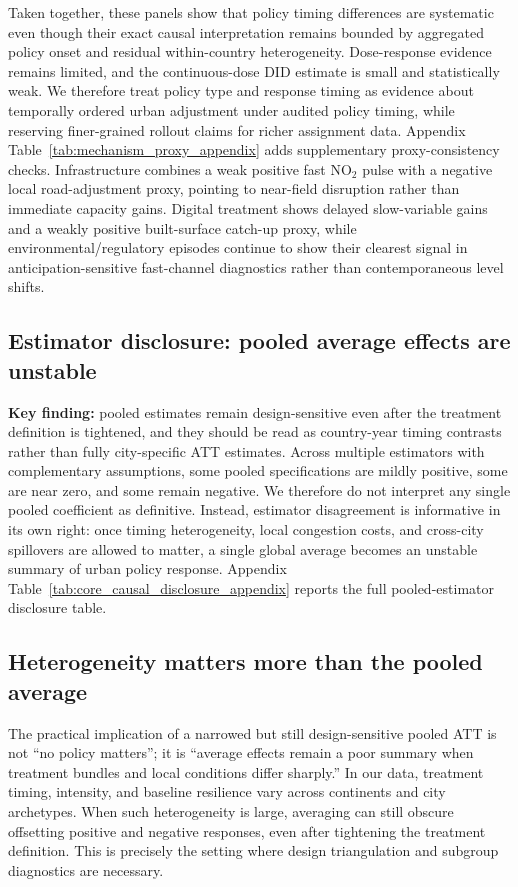 \documentclass[11pt,a4paper]{article}
\begin{document}
Taken together, these panels show that policy timing differences are systematic even though their exact causal interpretation remains bounded by aggregated policy onset and residual within-country heterogeneity.
Dose-response evidence remains limited, and the continuous-dose DID estimate is small and statistically weak.
We therefore treat policy type and response timing as evidence about temporally ordered urban adjustment under audited policy timing, while reserving finer-grained rollout claims for richer assignment data.
Appendix Table~\ref{tab:mechanism_proxy_appendix} adds supplementary proxy-consistency checks.
Infrastructure combines a weak positive fast NO$_2$ pulse with a negative local road-adjustment proxy, pointing to near-field disruption rather than immediate capacity gains.
Digital treatment shows delayed slow-variable gains and a weakly positive built-surface catch-up proxy, while environmental/regulatory episodes continue to show their clearest signal in anticipation-sensitive fast-channel diagnostics rather than contemporaneous level shifts.

\subsection{Estimator disclosure: pooled average effects are unstable}
\textbf{Key finding:} pooled estimates remain design-sensitive even after the treatment definition is tightened, and they should be read as country-year timing contrasts rather than fully city-specific ATT estimates.
Across multiple estimators with complementary assumptions, some pooled specifications are mildly positive, some are near zero, and some remain negative.
We therefore do not interpret any single pooled coefficient as definitive.
Instead, estimator disagreement is informative in its own right: once timing heterogeneity, local congestion costs, and cross-city spillovers are allowed to matter, a single global average becomes an unstable summary of urban policy response.
Appendix Table~\ref{tab:core_causal_disclosure_appendix} reports the full pooled-estimator disclosure table.

\subsection{Heterogeneity matters more than the pooled average}
The practical implication of a narrowed but still design-sensitive pooled ATT is not ``no policy matters''; it is ``average effects remain a poor summary when treatment bundles and local conditions differ sharply.''
In our data, treatment timing, intensity, and baseline resilience vary across continents and city archetypes.
When such heterogeneity is large, averaging can still obscure offsetting positive and negative responses, even after tightening the treatment definition.
This is precisely the setting where design triangulation and subgroup diagnostics are necessary.
\end{document}
